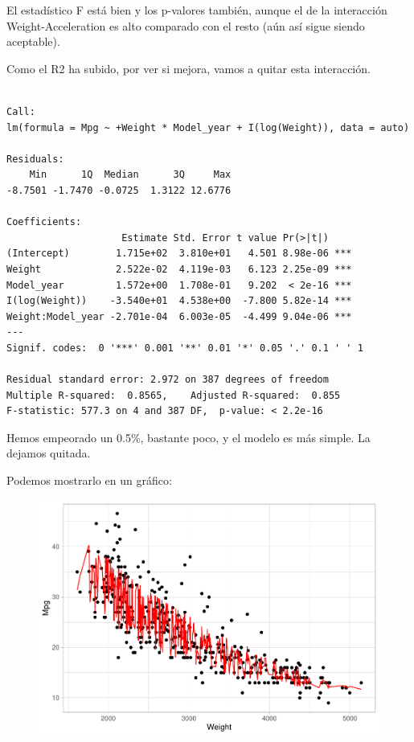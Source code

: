 El estadístico F está bien y los p-valores también, aunque el de la interacción Weight-Acceleration es alto comparado con el resto (aún así sigue siendo aceptable).

Como el R2 ha subido, por ver si mejora, vamos a quitar esta interacción.

\begin{verbatim}

Call:
lm(formula = Mpg ~ +Weight * Model_year + I(log(Weight)), data = auto)

Residuals:
    Min      1Q  Median      3Q     Max 
-8.7501 -1.7470 -0.0725  1.3122 12.6776 

Coefficients:
                    Estimate Std. Error t value Pr(>|t|)    
(Intercept)        1.715e+02  3.810e+01   4.501 8.98e-06 ***
Weight             2.522e-02  4.119e-03   6.123 2.25e-09 ***
Model_year         1.572e+00  1.708e-01   9.202  < 2e-16 ***
I(log(Weight))    -3.540e+01  4.538e+00  -7.800 5.82e-14 ***
Weight:Model_year -2.701e-04  6.003e-05  -4.499 9.04e-06 ***
---
Signif. codes:  0 '***' 0.001 '**' 0.01 '*' 0.05 '.' 0.1 ' ' 1

Residual standard error: 2.972 on 387 degrees of freedom
Multiple R-squared:  0.8565,    Adjusted R-squared:  0.855 
F-statistic: 577.3 on 4 and 387 DF,  p-value: < 2.2e-16
\end{verbatim}

Hemos empeorado un 0.5\%, bastante poco, y el modelo es más simple. La dejamos quitada.

Podemos mostrarlo en un gráfico:

\begin{figure}[H]\includegraphics[width=.9\linewidth]{img/Regresion_files/figure-latex/unnamed-chunk-19-1} \caption{}\end{figure}

